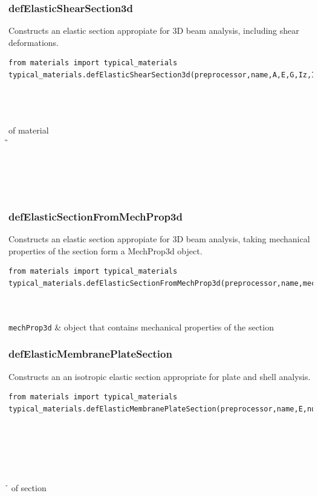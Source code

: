 \subsubsection{defElasticShearSection3d}
\noindent Constructs an elastic section appropiate for 3D beam analysis, including shear deformations.
\begin{verbatim}
from materials import typical_materials
typical_materials.defElasticShearSection3d(preprocessor,name,A,E,G,Iz,Iy,J,alpha)
\end{verbatim}
\begin{paramFuncTable}
\preprocessor{} \\
 \\
\A{} \\
\E of material \\
\G{} \\
\Iz{} \\
\Iy{} \\
\J{} \\
\alphaX{} \\
\end{paramFuncTable}

\subsubsection{defElasticSectionFromMechProp3d}
\noindent Constructs an elastic section appropiate for 3D beam analysis, taking mechanical properties of the section form a MechProp3d object.
\begin{verbatim}
from materials import typical_materials
typical_materials.defElasticSectionFromMechProp3d(preprocessor,name,mechProp3d)
\end{verbatim}
\begin{paramFuncTable}
\preprocessor{} \\
 \\
{\tt mechProp3d} & object that contains mechanical properties of the section  \\
\end{paramFuncTable}


\subsubsection{defElasticMembranePlateSection}
\noindent Constructs an an isotropic elastic section appropriate for plate and shell analysis.
\begin{verbatim}
from materials import typical_materials
typical_materials.defElasticMembranePlateSection(preprocessor,name,E,nu,rho,h)
\end{verbatim}
\begin{paramFuncTable}
\preprocessor{} \\
\\
\E{} \\
\nuX{} \\
\rhoX{} \\
\h{} of section\\
\end{paramFuncTable}

